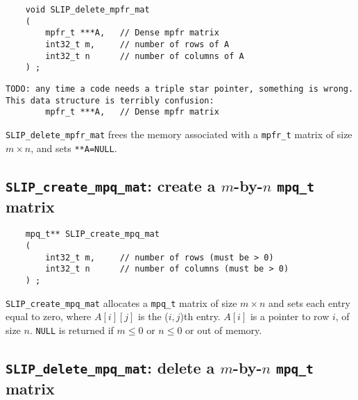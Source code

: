 \documentclass[12pt]{article}
\theoremstyle{definition}
\begin{document}
\begin{mdframed}[userdefinedwidth=6in]
{\footnotesize
\begin{verbatim}
    void SLIP_delete_mpfr_mat
    (
        mpfr_t ***A,   // Dense mpfr matrix
        int32_t m,     // number of rows of A
        int32_t n      // number of columns of A
    ) ;
\end{verbatim}
} \end{mdframed}

\begin{verbatim}
TODO: any time a code needs a triple star pointer, something is wrong.
This data structure is terribly confusion:
        mpfr_t ***A,   // Dense mpfr matrix
\end{verbatim}

\verb|SLIP_delete_mpfr_mat| frees the memory associated with a \verb|mpfr_t|
matrix of size $m \times n$, and sets \verb|**A=NULL|.

\cprotect\subsection{\verb|SLIP_create_mpq_mat|: create a $m$-by-$n$ \verb|mpq_t| matrix}
\label{ss:create_mpq_mat}

\begin{mdframed}[userdefinedwidth=6in]
{\footnotesize
\begin{verbatim}
    mpq_t** SLIP_create_mpq_mat
    (
        int32_t m,     // number of rows (must be > 0)
        int32_t n      // number of columns (must be > 0)
    ) ;
\end{verbatim}
} \end{mdframed}

\verb|SLIP_create_mpq_mat| allocates a \verb|mpq_t| matrix of size $m \times n$
and sets each entry equal to zero, where $A[i][j]$ is the ($i,j$)th entry.
$A[i]$ is a pointer to row $i$, of size $n$. \verb|NULL| is returned if
$m \le 0 $ or $n\le 0$ or out of memory.


\cprotect\subsection{\verb|SLIP_delete_mpq_mat|: delete a $m$-by-$n$ \verb|mpq_t| matrix}
\end{document}
